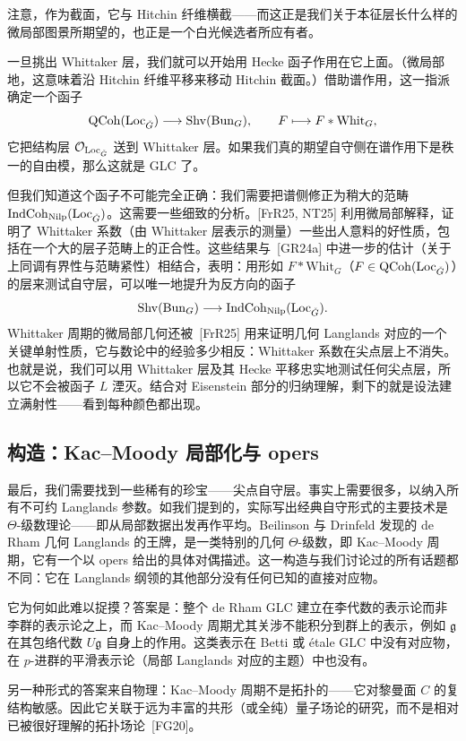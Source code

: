 注意，作为截面，它与 Hitchin 纤维横截——而这正是我们关于本征层长什么样的微局部图景所期望的，也正是一个白光候选者所应有者。

一旦挑出 Whittaker 层，我们就可以开始用 Hecke 函子作用在它上面。（微局部地，这意味着沿 Hitchin 纤维平移来移动 Hitchin 截面。）借助谱作用，这一指派确定一个函子
\[
\operatorname{QCoh}(\operatorname{Loc}_{\check{G}})\longrightarrow\operatorname{Shv}(\operatorname{Bun}_{G}),\qquad F\longmapsto F*\mathrm{Whit}_{G},
\]
它把结构层 $\mathcal{O}_{\operatorname{Loc}_{\check{G}}}$ 送到 Whittaker 层。如果我们真的期望自守侧在谱作用下是秩一的自由模，那么这就是 GLC 了。

但我们知道这个函子不可能完全正确：我们需要把谱侧修正为稍大的范畴 $\operatorname{IndCoh}_{\operatorname{Nilp}}(\operatorname{Loc}_{\check{G}})$。这需要一些细致的分析。[FrR25, NT25] 利用微局部解释，证明了 Whittaker 系数（由 Whittaker 层表示的测量）一些出人意料的好性质，包括在一个大的层子范畴上的正合性。这些结果与~[GR24a] 中进一步的估计（关于上同调有界性与范畴紧性）相结合，表明：用形如 $F*\mathrm{Whit}_{G}$（$F\in\operatorname{QCoh}(\operatorname{Loc}_{\check{G}})$）的层来测试自守层，可以唯一地提升为反方向的函子
\[
\operatorname{Shv}(\operatorname{Bun}_{G})\longrightarrow\operatorname{IndCoh}_{\operatorname{Nilp}}(\operatorname{Loc}_{\check{G}}).
\]
Whittaker 周期的微局部几何还被~[FrR25] 用来证明几何 Langlands 对应的一个关键单射性质，它与数论中的经验多少相反：Whittaker 系数在尖点层上不消失。也就是说，我们可以用 Whittaker 层及其 Hecke 平移忠实地测试任何尖点层，所以它不会被函子 $L$ 湮灭。结合对 Eisenstein 部分的归纳理解，剩下的就是设法建立满射性——看到每种颜色都出现。

\subsection{构造：Kac–Moody 局部化与 opers}\label{sec:5.5}

最后，我们需要找到一些稀有的珍宝——尖点自守层。事实上需要很多，以纳入所有不可约 Langlands 参数。如我们提到的，实际写出经典自守形式的主要技术是 $\Theta$-级数理论——即从局部数据出发再作平均。Beilinson 与 Drinfeld 发现的 de Rham 几何 Langlands 的王牌，是一类特别的几何 $\Theta$-级数，即 Kac–Moody 周期，它有一个以 opers 给出的具体对偶描述。这一构造与我们讨论过的所有话题都不同：它在 Langlands 纲领的其他部分没有任何已知的直接对应物。

它为何如此难以捉摸？答案是：整个 de Rham GLC 建立在李代数的表示论而非李群的表示论之上，而 Kac–Moody 周期尤其关涉不能积分到群上的表示，例如 $\mathfrak{g}$ 在其包络代数 $U\mathfrak{g}$ 自身上的作用。这类表示在 Betti 或 étale GLC 中没有对应物，在 $p$-进群的平滑表示论（局部 Langlands 对应的主题）中也没有。

另一种形式的答案来自物理：Kac–Moody 周期不是拓扑的——它对黎曼面 $C$ 的复结构敏感。因此它关联于远为丰富的共形（或全纯）量子场论的研究，而不是相对已被很好理解的拓扑场论~[FG20]。


